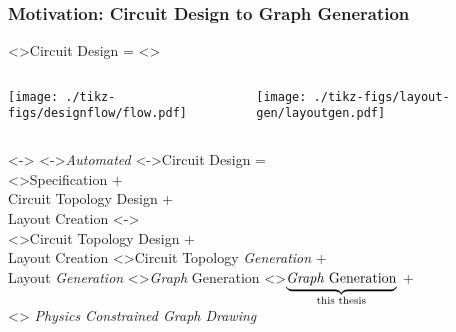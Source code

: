 \documentclass[./presentation.tex]{subfiles}
\begin{document}
\begin{frame}[label=workingonly,t]
  \frametitle{Motivation: Circuit Design to Graph Generation}
  \centering
  \resetmfrc{}
  \only<\mfrc{}>{Circuit Design =}
\stepmfrc{}
\only<\mfrc{}>{
\begin{columns}
  \begin{column}{0.5\textwidth}
    \texttt{[image: ./tikz-figs/designflow/flow.pdf]}
  \end{column}
  \begin{column}{0.5\textwidth}
    \texttt{[image: ./tikz-figs/layout-gen/layoutgen.pdf]}
  \end{column}
\end{columns}
}
\stepmfrc{}
\only<\mfrc{}->{
  {\large 
  \only<->{\emph{Automated }}\visible<\mfrc{}->{Circuit Design =}\\
    \stepmfrc{}
%
    \only<\mfrc{}>{Specification +\\ Circuit Topology Design +\\ Layout Creation}
      \stepmfrc{}
      \only<\mfrc{}->{\\}
      \only<\mfrc{}>{Circuit Topology Design +\\ Layout Creation}%
      \stepmfrc{}
      \only<\mfrc{}>{Circuit Topology \emph{Generation} +\\ Layout \emph{Generation}}%
      \stepmfrc{}
  \only<\mfrc{}>{\emph{Graph} Generation}
  \only<>{$\underbrace{\text{\emph{Graph} Generation}}_{\text{this thesis}}$} +\\ \uncover<\mfrc{}>{
 \emph{Physics Constrained Graph Drawing} 
}
  }%
}%

\end{frame}
\end{document}
